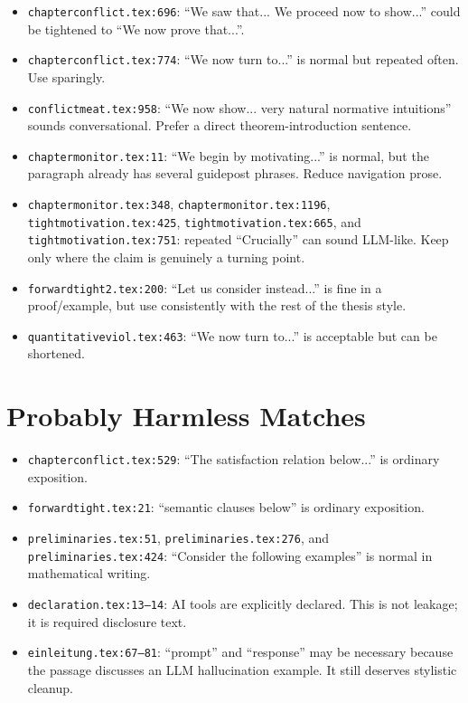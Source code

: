 \documentclass[11pt,a4paper]{article}
\newcommand{\loc}[1]{\texttt{#1}}
\begin{document}
\begin{itemize}
  \item \loc{chapterconflict.tex:696}: ``We saw that... We proceed now to show...''
  could be tightened to ``We now prove that...''.
  \item \loc{chapterconflict.tex:774}: ``We now turn to...'' is normal but repeated
  often. Use sparingly.
  \item \loc{conflictmeat.tex:958}: ``We now show... very natural normative
  intuitions'' sounds conversational. Prefer a direct theorem-introduction sentence.
  \item \loc{chaptermonitor.tex:11}: ``We begin by motivating...'' is normal, but
  the paragraph already has several guidepost phrases. Reduce navigation prose.
  \item \loc{chaptermonitor.tex:348}, \loc{chaptermonitor.tex:1196},
  \loc{tightmotivation.tex:425}, \loc{tightmotivation.tex:665}, and
  \loc{tightmotivation.tex:751}: repeated ``Crucially'' can sound LLM-like.
  Keep only where the claim is genuinely a turning point.
  \item \loc{forwardtight2.tex:200}: ``Let us consider instead...'' is fine in a
  proof/example, but use consistently with the rest of the thesis style.
  \item \loc{quantitativeviol.tex:463}: ``We now turn to...'' is acceptable but can
  be shortened.
\end{itemize}

\section*{Probably Harmless Matches}

\begin{itemize}
  \item \loc{chapterconflict.tex:529}: ``The satisfaction relation below...'' is
  ordinary exposition.
  \item \loc{forwardtight.tex:21}: ``semantic clauses below'' is ordinary exposition.
  \item \loc{preliminaries.tex:51}, \loc{preliminaries.tex:276}, and
  \loc{preliminaries.tex:424}: ``Consider the following examples'' is normal in
  mathematical writing.
  \item \loc{declaration.tex:13--14}: AI tools are explicitly declared. This is not
  leakage; it is required disclosure text.
  \item \loc{einleitung.tex:67--81}: ``prompt'' and ``response'' may be necessary
  because the passage discusses an LLM hallucination example. It still deserves
  stylistic cleanup.
\end{itemize}
\end{document}
